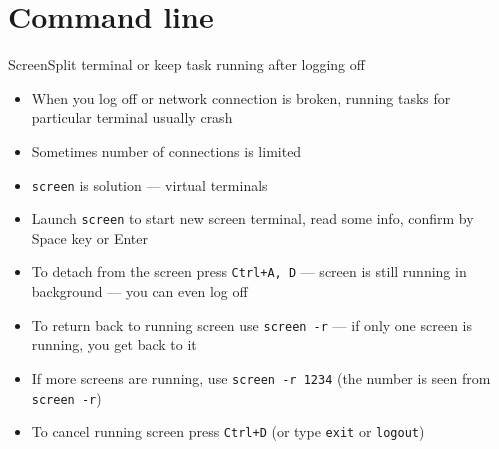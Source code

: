 \documentclass[hyperref={bookmarks=true, unicode=true, colorlinks=true, pdftitle={Linux, command line and MetaCentrum}, plainpages=false, pdfauthor={Vojtech Zeisek}, pdfsubject={Course about use of Linux command line, writing shell scripts and using MetaCentrum of CESNET}, pdfcreator={XeLaTeX, http://www.xelatex.org/}, pdfkeywords={Linux, GNU, BASH, shell, command line, MetaCentrum}, linkcolor=Sienna, anchorcolor=black, citecolor=green, filecolor=magenta, menucolor=Sienna, urlcolor=cyan, pdftex}, compress, ucs, xelatex, xcolor=svgnames, 11pt]{beamer}
\begin{document}
\section{Command line}

\begin{frame}{Screen}{Split terminal or keep task running after logging off}
\begin{itemize}
  \item When you log off or network connection is broken, running tasks for particular terminal usually crash
  \item Sometimes number of connections is limited
  \item \texttt{screen} is solution --- virtual terminals
  \item Launch \texttt{screen} to start new screen terminal, read some info, confirm by Space key or Enter
  \item To detach from the screen press \texttt{Ctrl+A, D} --- screen is still running in background --- you can even log off
  \item To return back to running screen use \texttt{screen -r} --- if only one screen is running, you get back to it
  \item If more screens are running, use \texttt{screen -r 1234} (the number is seen from \texttt{screen -r})
  \item To cancel running screen press \texttt{Ctrl+D} (or type \texttt{exit} or \texttt{logout})
\end{itemize}
\end{frame}
\end{document}
